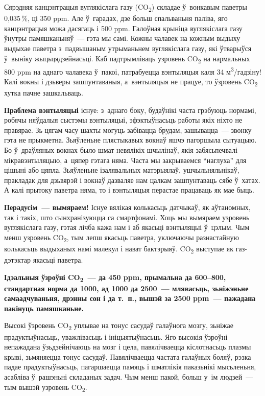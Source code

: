 Сярэдняя канцэнтрацыя вуглякіслага газу (CO\textsubscript{2}) складае ў~вонкавым паветры 0,035\,\%, ці 350 ppm. Але ў~гарадах, дзе больш спальваньня паліва, яго канцэнтрацыя можа дасягаць і 500 ppm. Галоўная крыніца вуглякіслага газу ўнутры памяшканьняў~--- гэта мы самі. Кожны чалавек на кожным выдыху выдыхае паветра з~падвышаным утрыманьнем вуглякіслага газу, які ўтварыўся ў~выніку жыцьцядзейнасьці. Каб падтрымліваць узровень CO\textsubscript{2} на нармальных 800 ppm на аднаго чалавека ў~пакоі, патрабуецца вэнтыляцыя каля 34 м\textsuperscript{3}/гадзіну! Калі вокны і дзьверы зашпунтаваныя, а~вэнтыляцыя не працуе, то ўзровень CO\textsubscript{2} хутка пачне зашкальваць.

\textbf{Праблема вэнтыляцыі} існуе: з~аднаго боку, будаўнікі часта грэбуюць нормамі, робячы няўдалыя сыстэмы вэнтыляцыі, эфэктыўнасьць работы якіх ніхто не правярае. Зь цягам часу шахты могуць забівацца брудам, зашывацца~--- звонку гэта не прыкметна. Зьяўленьне плястыкавых вокнаў яшчэ пагоршыла сытуацыю. Бо ў~драўляных вокнах было шмат невялікіх шчылінаў, якія забясьпечвалі мікравэнтыляцыю, а~цяпер гэтага няма. Часта мы закрываемся ``наглуха'' для цішыні або цяпла. Зьяўленьне ізалявальных матэрыялаў, ушчыльняльнікаў, пракладак для дзьвярэй і вокнаў дазваляе нам цалкам зашпунтаваць сябе ў~хатах. А калі прытоку паветра няма, то і вэнтыляцыя перастае працаваць як мае быць.

\textbf{Перадусім~--- вымяраем!} Існуе вялікая колькасьць датчыкаў, як аўтаномных, так і такіх, што сынхранізуюцца са смартфонамі. Хоць мы вымяраем узровень вуглякіслага газу, гэтая лічба кажа нам і аб якасьці вэнтыляцыі ў~цэлым. Чым менш узровень CO\textsubscript{2}, тым лепш якасьць паветра, уключаючы разнастайную колькасьць выдыханых намі малекул і нават бактэрыяў. CO\textsubscript{2} выступае як газ-дэтэктар якасьці паветра.

\textbf{Ідэальныя ўзроўні CO\textsubscript{2}~--- да 450 ppm, прымальна да 600--800, стандартная норма да 1000, ад 1000 да 2500~--- млявасьць, зьніжэньне самаадчуваньня, дрэнны сон і да т.~п., вышэй за 2500 ppm~--- пажадана пакінуць памяшканьне.}

Высокі ўзровень CO\textsubscript{2} уплывае на тонус сасудаў галаўнога мозгу, зьніжае прадуктыўнасьць, уважлівасьць і ініцыятыўнасьць. Яго высокія ўзроўні непажадана ўзьдзейнічаюць на мозг і цела, павялічваецца кіслотнасьць плазмы крыві, зьмяняецца тонус сасудаў. Павялічваецца частата галаўных боляў, рэзка падае прадуктыўнасьць, пагаршаецца памяць і шматлікія паказьнікі мысьленьня, асабліва ў~рашэньні складаных задач. Чым менш пакой, больш у~ім людзей~--- тым вышэй узровень CO\textsubscript{2}.

